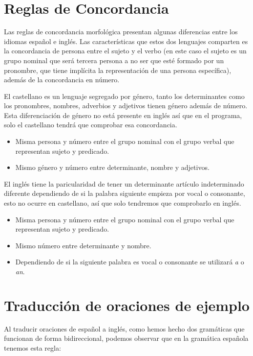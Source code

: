 \documentclass{article}
\begin{document}
\section{Reglas de Concordancia}
Las reglas de concordancia morfológica presentan algunas diferencias entre los idiomas español e inglés. Las características que estos 
dos lenguajes comparten es la concordancia de persona entre el sujeto y el verbo (en este caso el sujeto es un grupo nominal 
que será tercera persona a no ser que esté formado por un pronombre, que tiene implícita la representación de una persona 
específica), además de la concordancia en número. 

El castellano es un lenguaje segregado por género, tanto los determinantes como los pronombres, nombres, adverbios y adjetivos 
tienen género además de número. Esta diferenciación de género no está presente en inglés así que en el programa, solo el castellano 
tendrá que comprobar esa concordancia.
\begin{itemize}
    \item Misma persona y número entre el grupo nominal con el grupo verbal que representan sujeto y predicado.
    \item Mismo género y número entre determinante, nombre y adjetivos.
\end{itemize}

El inglés tiene la paricularidad de tener un determinante artículo indeterminado diferente dependiendo de si la palabra 
siguiente empieza por vocal o consonante, esto no ocurre en castellano, así que solo tendremos que comprobarlo en inglés.
\begin{itemize}
    \item Misma persona y número entre el grupo nominal con el grupo verbal que representan sujeto y predicado.
    \item Mismo número entre determinante y nombre.
    \item Dependiendo de si la siguiente palabra es vocal o consonante se utilizará \textit{a} o \textit{an}.
\end{itemize}


\section{Traducción de oraciones de ejemplo}
Al traducir oraciones de español a inglés, como hemos hecho dos gramáticas que funcionan de forma bidireccional, podemos observar 
que en la gramática española tenemos esta regla: 
\end{document}
